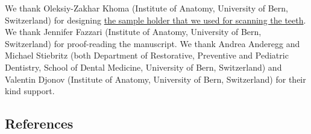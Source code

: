 \documentclass[
  american,
]{article}
\begin{document}
We thank Oleksiy-Zakhar Khoma (Institute of Anatomy, University of Bern, Switzerland) for designing \href{https://github.com/TomoGraphics/Hol3Drs/blob/master/STL/tooth_holder3.stl}{the sample holder that we used for scanning the teeth}.
We thank Jennifer Fazzari (Institute of Anatomy, University of Bern, Switzerland) for proof-reading the manuscript.
We thank Andrea Anderegg and Michael Stiebritz (both Department of Restorative, Preventive and Pediatric Dentistry, School of Dental Medicine, University of Bern, Switzerland) and Valentin Djonov (Institute of Anatomy, University of Bern, Switzerland) for their kind support.

\hypertarget{references}{%
\subsection{References}\label{references}}
\end{document}
